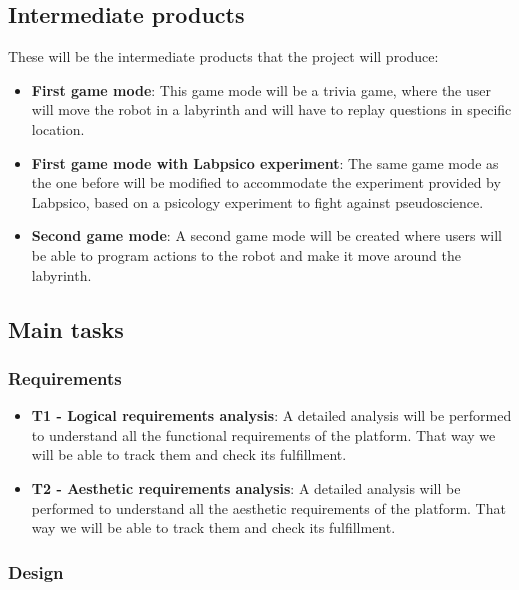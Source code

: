 \subsection{Intermediate products}

These will be the intermediate products that the project will produce:

\begin{itemize}
\item \textbf{First game mode}: This game mode will be a trivia game, where the user will move the
robot in a labyrinth and will have to replay questions in specific location.

\item \textbf{First game mode with Labpsico experiment}: The same game mode as the one before will
be modified to accommodate the experiment provided by Labpsico, based on a psicology experiment
to fight against pseudoscience.

\item \textbf{Second game mode}: A second game mode will be created where users will be able to
program actions to the robot and make it move around the labyrinth.
\end{itemize}

\subsection{Main tasks}

\subsubsection{Requirements}

\begin{itemize}
\item \textbf{T1 - Logical requirements analysis}: A detailed analysis will be performed to
understand all the functional requirements of the platform. That way we will be able to track them
and check its fulfillment.

\item \textbf{T2 - Aesthetic requirements analysis}: A detailed analysis will be performed to
understand all the aesthetic requirements of the platform. That way we will be able to track them
and check its fulfillment.
\end{itemize}

\subsubsection{Design}

